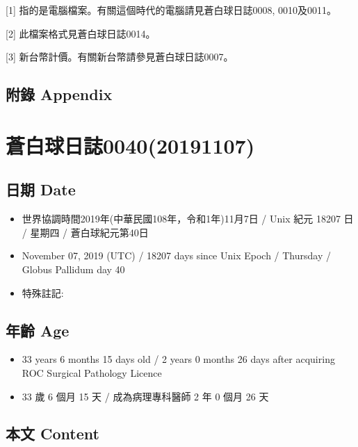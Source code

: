 \documentclass[a5paper, 12pt
]{book}
\providecommand{\tightlist}{%
  \setlength{\itemsep}{0pt}\setlength{\parskip}{0pt}}
\begin{document}
{[}1{]} 指的是電腦檔案。有關這個時代的電腦請見蒼白球日誌0008,
0010及0011。

{[}2{]} 此檔案格式見蒼白球日誌0014。

{[}3{]} 新台幣計價。有關新台幣請參見蒼白球日誌0007。

\hypertarget{ux9644ux9304-appendix-31}{%
\subsection{附錄 Appendix}\label{ux9644ux9304-appendix-31}}

\hypertarget{ux84bcux767dux7403ux65e5ux8a8c004020191107}{%
\section{蒼白球日誌0040(20191107)}\label{ux84bcux767dux7403ux65e5ux8a8c004020191107}}

\hypertarget{ux65e5ux671f-date-39}{%
\subsection{日期 Date}\label{ux65e5ux671f-date-39}}

\begin{itemize}
\tightlist
\item
  世界協調時間2019年(中華民國108年，令和1年)11月7日 / Unix 紀元 18207 日
  / 星期四 / 蒼白球紀元第40日
\item
  November 07, 2019 (UTC) / 18207 days since Unix Epoch / Thursday /
  Globus Pallidum day 40
\item
  特殊註記:
\end{itemize}

\hypertarget{ux5e74ux9f61-age-39}{%
\subsection{年齡 Age}\label{ux5e74ux9f61-age-39}}

\begin{itemize}
\tightlist
\item
  33 years 6 months 15 days old / 2 years 0 months 26 days after
  acquiring ROC Surgical Pathology Licence
\item
  33 歲 6 個月 15 天 / 成為病理專科醫師 2 年 0 個月 26 天
\end{itemize}

\hypertarget{ux672cux6587-content-39}{%
\subsection{本文 Content}\label{ux672cux6587-content-39}}
\end{document}
